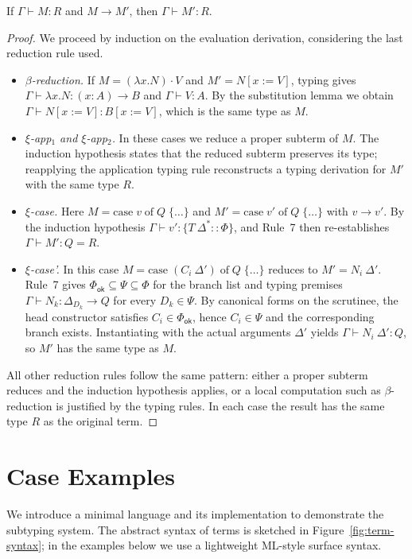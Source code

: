 \documentclass[a4paper, anonymous, UKenglish,cleveref, autoref, thm-restate]{lipics-v2021}
\begin{document}
\begin{theorem}[Preservation]
If $\Gamma \vdash M : R$ and $M \longrightarrow M'$, then $\Gamma \vdash M' : R$.
\end{theorem}
\begin{proof}
We proceed by induction on the evaluation derivation, considering the last reduction rule used.
\begin{itemize}
\item \emph{$\beta$-reduction.} If $M = (\lambda x. N) \cdot V$ and $M' = N[x := V]$, typing gives $\Gamma \vdash \lambda x. N : (x : A) \rightarrow B$ and $\Gamma \vdash V : A$. By the substitution lemma we obtain $\Gamma \vdash N[x := V] : B[x := V]$, which is the same type as $M$.
\item \emph{$\xi$-app$_1$ and $\xi$-app$_2$.} In these cases we reduce a proper subterm of $M$. The induction hypothesis states that the reduced subterm preserves its type; reapplying the application typing rule reconstructs a typing derivation for $M'$ with the same type $R$.
\item \emph{$\xi$-case.} Here $M = \text{case}\;v\;\text{of}\;Q\;\{\dots\}$ and $M' = \text{case}\;v'\;\text{of}\;Q\;\{\dots\}$ with $v \longrightarrow v'$. By the induction hypothesis $\Gamma \vdash v' : \{T\:\Delta^{*} :: \Phi\}$, and Rule~7 then re-establishes $\Gamma \vdash M' : Q = R$.
\item \emph{$\xi$-case'.} In this case $M = \text{case}\;(C_i\:\Delta')\;\text{of}\;Q\;\{\dots\}$ reduces to $M' = N_i\:\Delta'$. Rule~7 gives $\Phi_{\mathsf{ok}} \subseteq \Psi \subseteq \Phi$ for the branch list and typing premises $\Gamma \vdash N_k : \Delta_{D_k} \rightarrow Q$ for every $D_k \in \Psi$. By canonical forms on the scrutinee, the head constructor satisfies $C_i \in \Phi_{\mathsf{ok}}$, hence $C_i \in \Psi$ and the corresponding branch exists. Instantiating with the actual arguments $\Delta'$ yields $\Gamma \vdash N_i\:\Delta' : Q$, so $M'$ has the same type as $M$.


\end{itemize}
All other reduction rules follow the same pattern: either a proper subterm reduces and the induction hypothesis applies, or a local computation such as $\beta$-reduction is justified by the typing rules. In each case the result has the same type $R$ as the original term.
\end{proof}

\section{Case Examples}
\label{sec:cases}
We introduce a minimal language and its implementation to demonstrate the subtyping system. The abstract syntax of terms is sketched in Figure~\ref{fig:term-syntax}; in the examples below we use a lightweight ML-style surface syntax.
	
\end{document}
